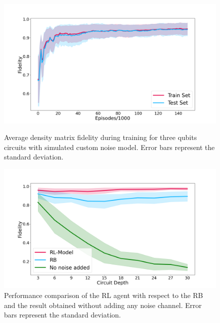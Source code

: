 \documentclass[sn-basic]{sn-jnl} %
\begin{document}
\begin{figure}
    \centering
    \includegraphics[width=\textwidth]{3Q_train_results.png}
    \caption{Average density matrix fidelity during training for three qubits circuits with simulated 
    custom noise model. Error bars represent the standard deviation.}\label{fig_3q_sim_train}
    \includegraphics[width=\textwidth]{3Q_rb.png}
    \caption{Performance comparison of the RL agent with respect to the RB and the result obtained 
    without adding any noise channel. Error bars represent the standard deviation.}\label{fig_3q_sim_bench}
\end{figure}
\end{document}
